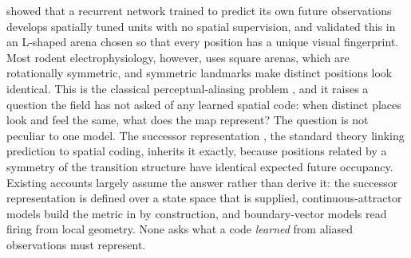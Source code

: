 \citet{levenstein2024} showed that a recurrent network trained to predict its own future observations
develops spatially tuned units with no spatial supervision, and validated this in an L-shaped arena
chosen so that every position has a unique visual fingerprint. Most rodent electrophysiology, however,
uses square arenas, which are rotationally symmetric, and symmetric landmarks make distinct positions
look identical. This is the classical perceptual-aliasing problem \citep{whitehead1991}, and it raises
a question the field has not asked of any learned spatial code: when distinct places look and feel the
same, what does the map represent? The question is not peculiar to one model. The successor
representation \citep{stachenfeld2017}, the standard theory linking prediction to spatial coding,
inherits it exactly, because positions related by a symmetry of the transition structure have
identical expected future occupancy. Existing accounts largely assume the answer rather than derive
it: the successor representation is defined over a state space that is supplied, continuous-attractor
models \citep{burak2009} build the metric in by construction, and boundary-vector models
\citep{hartley2000} read firing from local geometry. None asks what a code \emph{learned} from aliased
observations must represent.

